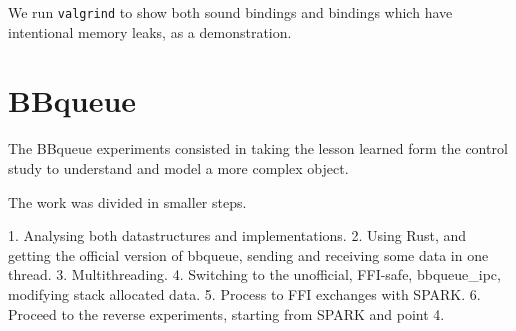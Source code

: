 \documentclass[nomenclature, english, bibtex]{kththesis}
\begin{document}
We run \texttt{valgrind} to show both sound bindings and bindings which have intentional memory leaks, as a demonstration.

\section{BBqueue}

The BBqueue experiments consisted in taking the lesson learned form the control study to understand and model a more complex object.


The work was divided in smaller steps.

1. Analysing both datastructures and implementations.
2. Using Rust, and getting the official version of bbqueue, sending and receiving some data in one thread.
3. Multithreading.
4. Switching to the unofficial, FFI-safe, bbqueue\_ipc, modifying stack allocated data. 
5. Process to FFI exchanges with SPARK.
6. Proceed to the reverse experiments, starting from SPARK and point 4.
\end{document}
